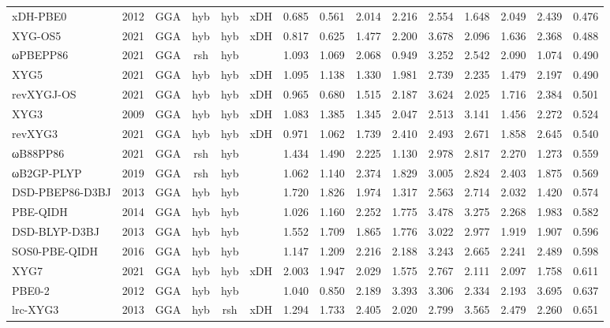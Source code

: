 \begin{landscape}
\begin{longtable}[c]{lcccccrrrrrrrrc}
xDH-PBE0         & 2012 & GGA  & hyb & hyb & xDH & 0.685 & 0.561 & 2.014  & 2.216  & 2.554  & 1.648  & 2.049  & 2.439  & 0.476 \\
XYG-OS5          & 2021 & GGA  & hyb & hyb & xDH & 0.817 & 0.625 & 1.477  & 2.200  & 3.678  & 2.096  & 1.636  & 2.368  & 0.488 \\
ωPBEPP86         & 2021 & GGA  & rsh & hyb &     & 1.093 & 1.069 & 2.068  & 0.949  & 3.252  & 2.542  & 2.090  & 1.074  & 0.490 \\
XYG5             & 2021 & GGA  & hyb & hyb & xDH & 1.095 & 1.138 & 1.330  & 1.981  & 2.739  & 2.235  & 1.479  & 2.197  & 0.490 \\
revXYGJ-OS       & 2021 & GGA  & hyb & hyb & xDH & 0.965 & 0.680 & 1.515  & 2.187  & 3.624  & 2.025  & 1.716  & 2.384  & 0.501 \\
XYG3             & 2009 & GGA  & hyb & hyb & xDH & 1.083 & 1.385 & 1.345  & 2.047  & 2.513  & 3.141  & 1.456  & 2.272  & 0.524 \\
revXYG3          & 2021 & GGA  & hyb & hyb & xDH & 0.971 & 1.062 & 1.739  & 2.410  & 2.493  & 2.671  & 1.858  & 2.645  & 0.540 \\
ωB88PP86         & 2021 & GGA  & rsh & hyb &     & 1.434 & 1.490 & 2.225  & 1.130  & 2.978  & 2.817  & 2.270  & 1.273  & 0.559 \\
ωB2GP-PLYP       & 2019 & GGA  & rsh & hyb &     & 1.062 & 1.140 & 2.374  & 1.829  & 3.005  & 2.824  & 2.403  & 1.875  & 0.569 \\
DSD-PBEP86-D3BJ  & 2013 & GGA  & hyb & hyb &     & 1.720 & 1.826 & 1.974  & 1.317  & 2.563  & 2.714  & 2.032  & 1.420  & 0.574 \\
PBE-QIDH         & 2014 & GGA  & hyb & hyb &     & 1.026 & 1.160 & 2.252  & 1.775  & 3.478  & 3.275  & 2.268  & 1.983  & 0.582 \\
DSD-BLYP-D3BJ    & 2013 & GGA  & hyb & hyb &     & 1.552 & 1.709 & 1.865  & 1.776  & 3.022  & 2.977  & 1.919  & 1.907  & 0.596 \\
SOS0-PBE-QIDH    & 2016 & GGA  & hyb & hyb &     & 1.147 & 1.209 & 2.216  & 2.188  & 3.243  & 2.665  & 2.241  & 2.489  & 0.598 \\
XYG7             & 2021 & GGA  & hyb & hyb & xDH & 2.003 & 1.947 & 2.029  & 1.575  & 2.767  & 2.111  & 2.097  & 1.758  & 0.611 \\
PBE0-2           & 2012 & GGA  & hyb & hyb &     & 1.040 & 0.850 & 2.189  & 3.393  & 3.306  & 2.334  & 2.193  & 3.695  & 0.637 \\
lrc-XYG3         & 2013 & GGA  & hyb & rsh & xDH & 1.294 & 1.733 & 2.405  & 2.020  & 2.799  & 3.565  & 2.479  & 2.260  & 0.651 \\

\end{longtable}
\end{landscape}
